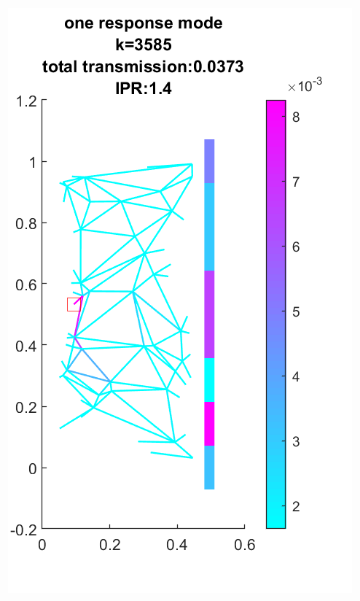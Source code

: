 \vspace{1cm}
\begin{figure}[h]
    \centering
    \begin{subfigure}[b]{0.4\textwidth}
        \includegraphics[width=\textwidth]{ch3/fig3/response_mode_N50D05d.png}
    \end{subfigure}
~\quad\quad
    \begin{subfigure}[b]{0.4\textwidth}

\end{subfigure}
\end{figure}
